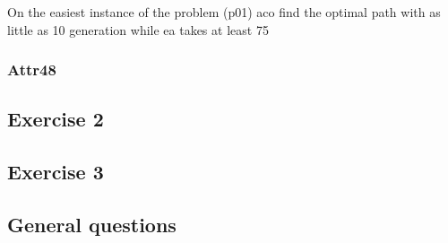 On the easiest instance of the problem (p01) aco find the optimal path with as little as 10 generation while ea takes at least 75 

\subsubsection{Attr48}
\subsection{Exercise 2}

\subsection{Exercise 3}

\subsection{General questions}